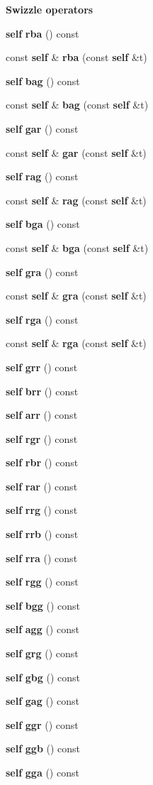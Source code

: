 \begin{Indent}{\bf Swizzle operators}
\begin{CompactItemize}
{\bf self} {\bf rba} () const 
\item 
const {\bf self} \& {\bf rba} (const {\bf self} \&t)
\item 
{\bf self} {\bf bag} () const 
\item 
const {\bf self} \& {\bf bag} (const {\bf self} \&t)
\item 
{\bf self} {\bf gar} () const 
\item 
const {\bf self} \& {\bf gar} (const {\bf self} \&t)
\item 
{\bf self} {\bf rag} () const 
\item 
const {\bf self} \& {\bf rag} (const {\bf self} \&t)
\item 
{\bf self} {\bf bga} () const 
\item 
const {\bf self} \& {\bf bga} (const {\bf self} \&t)
\item 
{\bf self} {\bf gra} () const 
\item 
const {\bf self} \& {\bf gra} (const {\bf self} \&t)
\item 
{\bf self} {\bf rga} () const 
\item 
const {\bf self} \& {\bf rga} (const {\bf self} \&t)
\item 
{\bf self} {\bf grr} () const 
\item 
{\bf self} {\bf brr} () const 
\item 
{\bf self} {\bf arr} () const 
\item 
{\bf self} {\bf rgr} () const 
\item 
{\bf self} {\bf rbr} () const 
\item 
{\bf self} {\bf rar} () const 
\item 
{\bf self} {\bf rrg} () const 
\item 
{\bf self} {\bf rrb} () const 
\item 
{\bf self} {\bf rra} () const 
\item 
{\bf self} {\bf rgg} () const 
\item 
{\bf self} {\bf bgg} () const 
\item 
{\bf self} {\bf agg} () const 
\item 
{\bf self} {\bf grg} () const 
\item 
{\bf self} {\bf gbg} () const 
\item 
{\bf self} {\bf gag} () const 
\item 
{\bf self} {\bf ggr} () const 
\item 
{\bf self} {\bf ggb} () const 
\item 
{\bf self} {\bf gga} () const 

\end{CompactItemize}
\end{Indent}

